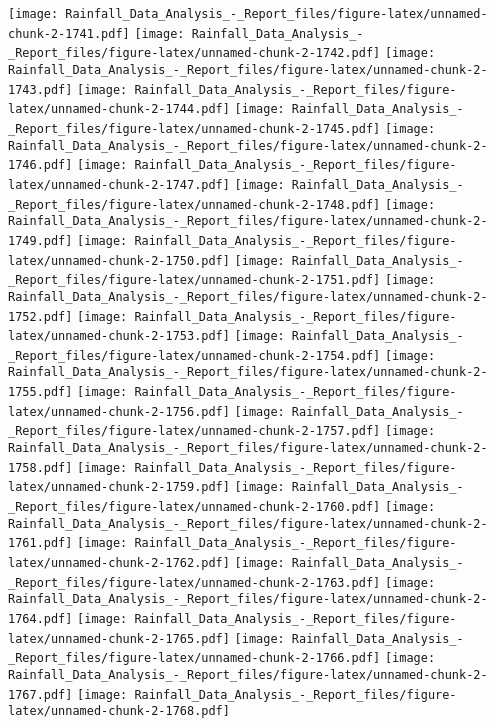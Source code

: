 \documentclass[
]{article}
\begin{document}
\texttt{[image: Rainfall\_Data\_Analysis\_-\_Report\_files/figure-latex/unnamed-chunk-2-1741.pdf]}
\texttt{[image: Rainfall\_Data\_Analysis\_-\_Report\_files/figure-latex/unnamed-chunk-2-1742.pdf]}
\texttt{[image: Rainfall\_Data\_Analysis\_-\_Report\_files/figure-latex/unnamed-chunk-2-1743.pdf]}
\texttt{[image: Rainfall\_Data\_Analysis\_-\_Report\_files/figure-latex/unnamed-chunk-2-1744.pdf]}
\texttt{[image: Rainfall\_Data\_Analysis\_-\_Report\_files/figure-latex/unnamed-chunk-2-1745.pdf]}
\texttt{[image: Rainfall\_Data\_Analysis\_-\_Report\_files/figure-latex/unnamed-chunk-2-1746.pdf]}
\texttt{[image: Rainfall\_Data\_Analysis\_-\_Report\_files/figure-latex/unnamed-chunk-2-1747.pdf]}
\texttt{[image: Rainfall\_Data\_Analysis\_-\_Report\_files/figure-latex/unnamed-chunk-2-1748.pdf]}
\texttt{[image: Rainfall\_Data\_Analysis\_-\_Report\_files/figure-latex/unnamed-chunk-2-1749.pdf]}
\texttt{[image: Rainfall\_Data\_Analysis\_-\_Report\_files/figure-latex/unnamed-chunk-2-1750.pdf]}
\texttt{[image: Rainfall\_Data\_Analysis\_-\_Report\_files/figure-latex/unnamed-chunk-2-1751.pdf]}
\texttt{[image: Rainfall\_Data\_Analysis\_-\_Report\_files/figure-latex/unnamed-chunk-2-1752.pdf]}
\texttt{[image: Rainfall\_Data\_Analysis\_-\_Report\_files/figure-latex/unnamed-chunk-2-1753.pdf]}
\texttt{[image: Rainfall\_Data\_Analysis\_-\_Report\_files/figure-latex/unnamed-chunk-2-1754.pdf]}
\texttt{[image: Rainfall\_Data\_Analysis\_-\_Report\_files/figure-latex/unnamed-chunk-2-1755.pdf]}
\texttt{[image: Rainfall\_Data\_Analysis\_-\_Report\_files/figure-latex/unnamed-chunk-2-1756.pdf]}
\texttt{[image: Rainfall\_Data\_Analysis\_-\_Report\_files/figure-latex/unnamed-chunk-2-1757.pdf]}
\texttt{[image: Rainfall\_Data\_Analysis\_-\_Report\_files/figure-latex/unnamed-chunk-2-1758.pdf]}
\texttt{[image: Rainfall\_Data\_Analysis\_-\_Report\_files/figure-latex/unnamed-chunk-2-1759.pdf]}
\texttt{[image: Rainfall\_Data\_Analysis\_-\_Report\_files/figure-latex/unnamed-chunk-2-1760.pdf]}
\texttt{[image: Rainfall\_Data\_Analysis\_-\_Report\_files/figure-latex/unnamed-chunk-2-1761.pdf]}
\texttt{[image: Rainfall\_Data\_Analysis\_-\_Report\_files/figure-latex/unnamed-chunk-2-1762.pdf]}
\texttt{[image: Rainfall\_Data\_Analysis\_-\_Report\_files/figure-latex/unnamed-chunk-2-1763.pdf]}
\texttt{[image: Rainfall\_Data\_Analysis\_-\_Report\_files/figure-latex/unnamed-chunk-2-1764.pdf]}
\texttt{[image: Rainfall\_Data\_Analysis\_-\_Report\_files/figure-latex/unnamed-chunk-2-1765.pdf]}
\texttt{[image: Rainfall\_Data\_Analysis\_-\_Report\_files/figure-latex/unnamed-chunk-2-1766.pdf]}
\texttt{[image: Rainfall\_Data\_Analysis\_-\_Report\_files/figure-latex/unnamed-chunk-2-1767.pdf]}
\texttt{[image: Rainfall\_Data\_Analysis\_-\_Report\_files/figure-latex/unnamed-chunk-2-1768.pdf]}
\end{document}
